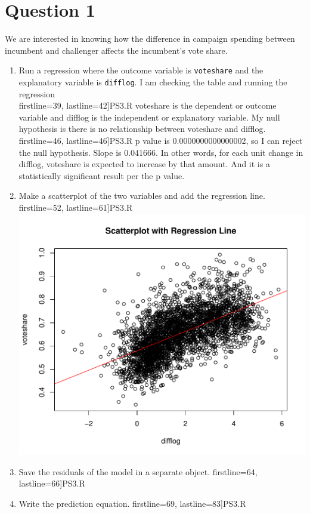 \documentclass[12pt,letterpaper]{article}
\begin{document}
\section*{Question 1}
\vspace{.25cm}
\noindent We are interested in knowing how the difference in campaign spending between incumbent and challenger affects the incumbent's vote share. 
	\begin{enumerate}
		\item Run a regression where the outcome variable is \texttt{voteshare} and the explanatory variable is \texttt{difflog}.
		\vspace{0.2cm}
		\noindent I am checking the table and running the regression \\
		 firstline=39, lastline=42]{PS3.R} 
		\noindent voteshare is the dependent or outcome variable and difflog is the independent or explanatory variable. My null hypothesis is there is no relationship between voteshare and difflog. \\
		 firstline=46, lastline=46]{PS3.R} 
		\noindent p value is 0.0000000000000002, so I can reject the null hypothesis. Slope is 0.041666. In other words, for each unit change in difflog, voteshare is expected to increase by that amount. And it is a statistically significant result per the p value. \\
		\item Make a scatterplot of the two variables and add the regression line. 	\vspace{0.2cm}
		 firstline=52, lastline=61]{PS3.R} 
		\noindent\includegraphics[width=.75\textwidth]{scatterplot1.pdf}
		\label{fig:scatterplot_1}
		\item Save the residuals of the model in a separate object.	\vspace{0.2cm}
		 firstline=64, lastline=66]{PS3.R} 
		\item Write the prediction equation.
		 firstline=69, lastline=83]{PS3.R} 
	\end{enumerate}
\end{document}
